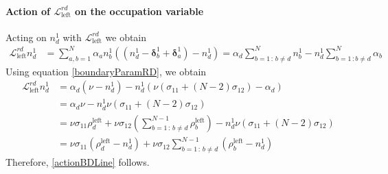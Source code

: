 \documentclass[10pt]{article}
\numberwithin{equation}{section}
\numberwithin{equation}{subsection}
\begin{document}
\paragraph{Action of $\mathcal{L}_{\text{left}}^{rd}$ on the occupation variable}
Acting on $n_{d}^{1}$  with $\mathcal{L}_{\text{left}}^{rd}$ we obtain
\begin{equation}\label{actionBoudaryRD}
	\begin{split}
		\mathcal{L}_{\text{left}}^{rd}n_{d}^{1}&=\sum_{a,b=1}^{N}\alpha_{a}n_{b}^{1}\left((n_{d}^{1}-\bm{\delta}_{b}^{1}+\bm{\delta}_{a}^{1})-n_{d}^{1}\right)=\alpha_{d}\sum_{b=1\,:\,b\neq d}^{N}n_{b}^{1}-n_{d}^{1}\sum_{b=1\,:b\neq d}^{N}\alpha_{b}
	\end{split}
\end{equation}
Using equation \eqref{boundaryParamRD}, we obtain 
\begin{align}
			\mathcal{L}_{\text{left}}^{rd}n_{d}^{1}&=
		\alpha_{d}\left(\nu-n_{d}^{1}\right)-n_{d}^{1}\left(\nu(\sigma_{11}+(N-2)\sigma_{12})-\alpha_{d}\right)
		\\&=\alpha_{d}\nu-n_{d}^{1}\nu(\sigma_{11}+(N-2)\sigma_{12})
		\\&=
		\nu\sigma_{11}\rho_{d}^{\text{left}}+\nu\sigma_{12}\left(\sum_{b=1\,:\,b\neq d}^{N-1}\rho_{b}^{\text{left}}\right)-n_{d}^{1}\nu(\sigma_{11}+(N-2)\sigma_{12})
		\\&=
		\nu \sigma_{11} (\rho_{d}^{\text{left}}-n_{d}^{1})+\nu\sigma_{12}\sum_{b=1\,:\,b\neq d}^{N-1}(\rho_{b}^{\text{left}}-n_{d}^{1})
	\end{align}
Therefore, \eqref{actionBDLine} follows.


\end{document}
